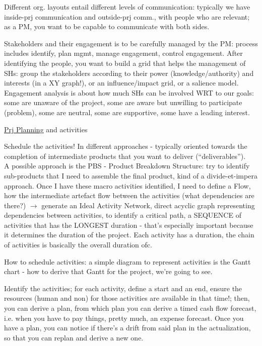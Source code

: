 \noindent Different org. layouts entail different levels of communication: typically we have inside-prj communication and outside-prj comm., with people who are relevant; as a PM, you want to be capable to communicate with both sides.

\noindent Stakeholders and their engagement is to be carefully managed by the PM: process includes identify, plan mgmt, manage engagement, control engagement. After identifying the people, you want to build a grid that helps the management of SHs: group the stakeholders according to their power (knowledge/authority) and interests (in a XY graph!), or an influence/impact grid, or a salience model. Engagement analysis is about how much SHs can be involved WRT to our goals: some are unaware of the project, some are aware but unwilling to participate (problem), some are neutral, some are supportive, some have a leading interest.

\newpage \underline{Prj Planning} and activities

\noindent Schedule the activities! In different approaches - typically oriented towards the completion of intermediate products that you want to deliver (``deliverables'').\\
A possible approach is the PBS - Product Breakdown Structure: try to identify sub-products that I need to assemble the final product, kind of a divide-et-impera approach. Once I have these macro activities identified, I need to define a Flow, how the intermediate artefact flow between the activities (what dependencies are there?) $\rightarrow$ generate an Ideal Activity Network, direct acyclic graph representing dependencies between activities, to identify a critical path, a SEQUENCE of activities that has the LONGEST duration - that's especially important because it determines the duration of the project. Each activity has a duration, the chain of activities is basically the overall duration ofc.

\noindent How to schedule activities: a simple diagram to represent activities is the Gantt chart - how to derive that Gantt for the project, we're going to see.

\noindent Identify the activities; for each activity, define a start and an end, ensure the resources (human and non) for those activities are available in that time!; then, you can derive a plan, from which plan you can derive a timed cash flow forecast, i.e. when you have to pay things, pretty much, an expense forecast. Once you have a plan, you can notice if there's a drift from said plan in the actualization, so that you can replan and derive a new one.

